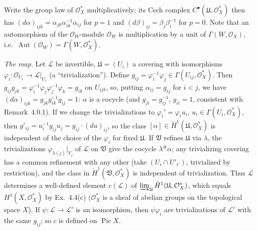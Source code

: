 \documentclass[11pt]{article}
\begin{document}
\pf
Write the group law of $\mathcal O_X^*$ multiplicatively; its Cech complex $C^\bullet(\mathfrak U,\mathcal O_X^*)$ then has $(d\alpha)_{ijk}=\alpha_{jk}\alpha_{ik}^{-1}\alpha_{ij}$ for $p=1$ and $(d\beta)_{ij}=\beta_j\beta_i^{-1}$ for $p=0$. Note that an automorphism of the $\mathcal O_W$-module $\mathcal O_W$ is multiplication by a unit of $\Gamma(W,\mathcal O_X)$, i.e.\ $\operatorname{Aut}(\mathcal O_W)=\Gamma(W,\mathcal O_X^*)$.

\emph{The map.} Let $\mathcal L$ be invertible, $\mathfrak U=(U_i)$ a covering with isomorphisms $\varphi_i:\mathcal O_{U_i}\to\mathcal L|_{U_i}$ (a ``trivialization''). Define $g_{ij}=\varphi_i^{-1}\varphi_j\in\Gamma(U_{ij},\mathcal O_X^*)$. Then $g_{ij}g_{jk}=\varphi_i^{-1}\varphi_j\varphi_j^{-1}\varphi_k=g_{ik}$ on $U_{ijk}$, so, putting $\alpha_{ij}=g_{ij}$ for $i<j$, we have $(d\alpha)_{ijk}=g_{jk}g_{ik}^{-1}g_{ij}=1$: $\alpha$ is a cocycle (and $g_{ji}=g_{ij}^{-1}$, $g_{ii}=1$, consistent with Remark~4.0.1). If we change the trivializations to $\varphi_i'=\varphi_iu_i$, $u_i\in\Gamma(U_i,\mathcal O_X^*)$, then $g'_{ij}=u_i^{-1}g_{ij}u_j=g_{ij}\cdot(du)_{ij}$, so the class $[\alpha]\in\check H^1(\mathfrak U,\mathcal O_X^*)$ is independent of the choice of the $\varphi_i$ for fixed $\mathfrak U$. If $\mathfrak V$ refines $\mathfrak U$ via $\lambda$, the trivializations $\varphi_{\lambda(j)}|_{V_j}$ of $\mathcal L$ on $\mathfrak V$ give the cocycle $\lambda^\#\alpha$; any trivializing covering has a common refinement with any other (take $(U_i\cap U'_{i'})$, trivialized by restriction), and the class in $\check H^1(\mathfrak V,\mathcal O_X^*)$ is independent of trivialization. Thus $\mathcal L$ determines a well-defined element $c(\mathcal L)$ of $\varinjlim_{\mathfrak U}\check H^1(\mathfrak U,\mathcal O_X^*)$, which equals $H^1(X,\mathcal O_X^*)$ by Ex.~4.4(c) ($\mathcal O_X^*$ is a sheaf of abelian groups on the topological space $X$). If $\psi:\mathcal L\to\mathcal L'$ is an isomorphism, then $\psi\varphi_i$ are trivializations of $\mathcal L'$ with the same $g_{ij}$; so $c$ is defined on $\operatorname{Pic}X$.
\end{document}
